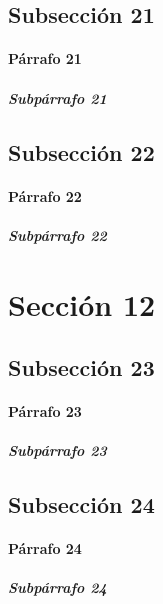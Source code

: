 \documentclass[11pt,a4paper]{book}
\begin{document}
       \subsection{Subsección 21}
       \lipsum[1]
       \paragraph{Párrafo 21 }
       \lipsum[2] 
       \subparagraph{Subpárrafo 21} 
       \lipsum[4] 
       \subsection{Subsección 22}
       \lipsum[1]
       \paragraph{Párrafo 22 }
       \lipsum[2] 
       \subparagraph{Subpárrafo 22} 
       \lipsum[4] 
      \section{Sección 12}
       \subsection{Subsección 23}
       \lipsum[1]
       \paragraph{Párrafo 23 }
       \lipsum[2] 
       \subparagraph{Subpárrafo 23} 
       \lipsum[4] 
       \subsection{Subsección 24}
       \lipsum[1]
       \paragraph{Párrafo 24 }
       \lipsum[2] 
       \subparagraph{Subpárrafo 24} 
       \lipsum[4] 
\end{document}

